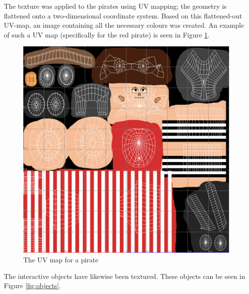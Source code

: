 The texture was applied to the pirates using UV mapping; the geometry is flattened onto a two-dimensional coordinate system. Based on this flattened-out UV-map, an image containing all the necessary colours was created. An example of such a UV map (specifically for the red pirate) is seen in Figure \ref{fig:uv_map}.

\begin{figure}[h!]
	\centering
	\includegraphics[width=\textwidth]{figures/uv_map.png}
	\caption{The UV map for a pirate \label{fig:uv_map}}
\end{figure}

The interactive objects have likewise been textured. These objects can be seen in Figure \ref{fig:objects}.

